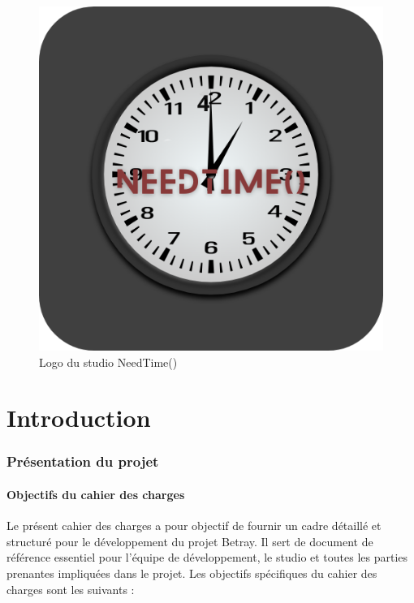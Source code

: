 \documentclass[
	article,			%
	11pt,				%
	oneside,			%
	a4paper,			%
	chapter=TITLE,
	french,			%
	sumario=tradicional
	]{base_nt}
\begin{document}
\vspace{10cm}
\begin{figure}[ht]
	\caption{Logo du studio NeedTime()}
	\centering
	\includegraphics[width=0.4\linewidth]{logpapp.png}
	
\end{figure}

\textual

\newpage

\customtableofcontents

\newpage

\part{Introduction}
\section{Présentation du projet}

\subsection{Objectifs du cahier des charges}

Le présent cahier des charges a pour objectif de fournir un cadre détaillé et structuré pour le développement du projet Betray. Il sert de document de référence essentiel pour l'équipe de développement, le studio et toutes les parties prenantes impliquées dans le projet. Les objectifs spécifiques du cahier des charges sont les suivants :
\end{document}
